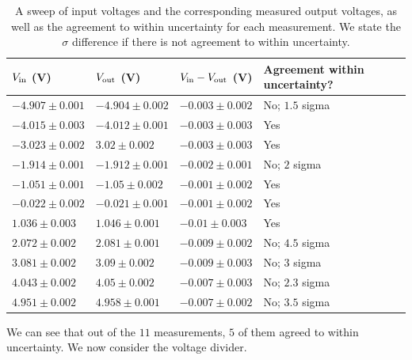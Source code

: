 \documentclass[11pt]{article}
\begin{document}
\begin{table}[H]
	\centering
	\begin{tabular}{|l|l|l|l|}
	\hline
	$V_{\rm in}$ (V)   & $V_{\rm out}$ (V)  & $V_{\rm in} - V_{\rm out}$ (V) & Agreement within uncertainty? \\
	\hline
	$-4.907 \pm 0.001$ & $-4.904 \pm 0.002$ & $-0.003 \pm 0.002$           & No; $1.5$ sigma                  \\
	$-4.015 \pm 0.003$ & $-4.012 \pm 0.001$ & $-0.003 \pm 0.003$           & Yes                           \\
	$-3.023 \pm 0.002$ & $3.02 \pm 0.002$   & $-0.003 \pm 0.003$           & Yes                           \\
	$-1.914 \pm 0.001$ & $-1.912 \pm 0.001$ & $-0.002 \pm 0.001$           & No; $2$ sigma                 \\
	$-1.051 \pm 0.001$ & $-1.05 \pm 0.002$  & $-0.001 \pm 0.002$           & Yes                           \\
	$-0.022 \pm 0.002$ & $-0.021 \pm 0.001$ & $-0.001 \pm 0.002$           & Yes                           \\
	$1.036 \pm 0.003$  & $1.046 \pm 0.001$  & $-0.01 \pm 0.003$            & Yes                           \\
	$2.072 \pm 0.002$  & $2.081 \pm 0.001$  & $-0.009 \pm 0.002$           & No; $4.5$ sigma                 \\
	$3.081 \pm 0.002$  & $3.09 \pm 0.002$   & $-0.009 \pm 0.003$           & No; $3$ sigma                 \\
	$4.043 \pm 0.002$  & $4.05 \pm 0.002$   & $-0.007 \pm 0.003$           & No; $2.3$ sigma                 \\
	$4.951 \pm 0.002$  & $4.958 \pm 0.001$  & $-0.007 \pm 0.002$           & No; $3.5$ sigma                 \\
	\hline
	\end{tabular}
	\caption{A sweep of input voltages and the corresponding measured
	output voltages, as well as the agreement to within uncertainty
	for each measurement. We state the $\sigma$ difference if there
	is not agreement to within uncertainty.}
\end{table}

We can see that out of the $11$ measurements, $5$ of them
agreed to within uncertainty. We now consider the voltage divider.
\end{document}
